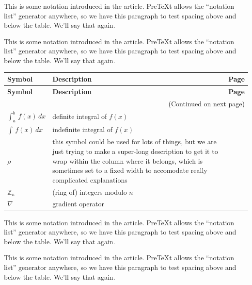 \documentclass{sn-jnl}
\theoremstyle{thmstyleone}%
\theoremstyle{thmstyletwo}%
\theoremstyle{thmstylethree}%
\numberwithin{equation}{section}
\begin{document}
\begin{appendices}%
%
%
%
\typeout{************************************************}
\typeout{************************************************}
%
\label{appendix-notation}%
This is some notation introduced in the article.  PreTeXt allows the ``notation list'' generator anywhere, so we have this paragraph to test spacing above and below the table.  We'll say that again.%
\par
This is some notation introduced in the article.  PreTeXt allows the ``notation list'' generator anywhere, so we have this paragraph to test spacing above and below the table.  We'll say that again.%
\begin{longtable}[l]{lp{}r}
\addtocounter{table}{-1}
\textbf{Symbol}&\textbf{Description}&\textbf{Page}\\[1em]
\endfirsthead
\textbf{Symbol}&\textbf{Description}&\textbf{Page}\\[1em]
\endhead
\multicolumn{3}{r}{(Continued on next page)}\\
\endfoot
\endlastfoot
\(\int_a^b\,f(x)\,dx\)&definite integral of \(f(x)\)&\pageref{section-introduction-2-5}\\
\(\int\,f(x)\,dx\)&indefinite integral of \(f(x)\)&\pageref{definition-indefinite-integral-3}\\
\(\rho\)&this symbol could be used for lots of things, but we are just trying to make a super-long description to get it to wrap within the column where it belongs, which is sometimes set to a fixed width to accomodate really complicated explanations&\pageref{derivatives-9-2-3}\\
\(\mathbb{Z}_n\)&(ring of) integers modulo \(n\)&\pageref{derivatives-9-2-11}\\
\(\nabla\)&gradient operator&\pageref{section-mathematics-3-3-3}\\
\end{longtable}
This is some notation introduced in the article.  PreTeXt allows the ``notation list'' generator anywhere, so we have this paragraph to test spacing above and below the table.  We'll say that again.%
\par
This is some notation introduced in the article.  PreTeXt allows the ``notation list'' generator anywhere, so we have this paragraph to test spacing above and below the table.  We'll say that again.%
%
%
\typeout{************************************************}
\typeout{************************************************}

\end{appendices}
\end{document}
